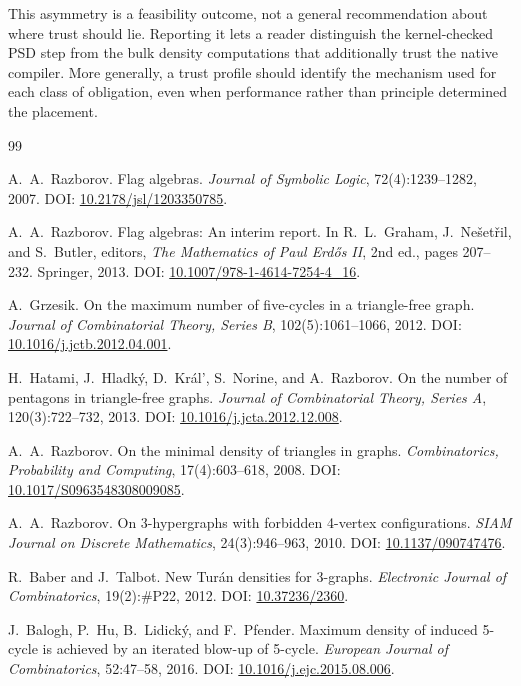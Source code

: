 \documentclass{article}
\newcommand\DOI[1]{DOI: \href{https://doi.org/#1}{#1}}
\begin{document}
{This asymmetry is a feasibility outcome, not a general recommendation about
where trust should lie.  Reporting it lets a reader distinguish the
kernel-checked PSD step from the bulk density computations that additionally
trust the native compiler.  More generally, a trust profile should identify
the mechanism used for each class of obligation, even when performance rather
than principle determined the placement.
}


\begin{thebibliography}{99}

A.~A.~Razborov.
\newblock Flag algebras.
\newblock \textit{Journal of Symbolic Logic}, 72(4):1239--1282, 2007.
  \DOI{10.2178/jsl/1203350785}.

A.~A.~Razborov.
\newblock Flag algebras: An interim report.
\newblock In R.~L.~Graham, J.~Ne\v{s}et\v{r}il, and S.~Butler, editors,
  \textit{The Mathematics of Paul Erd\H{o}s II}, 2nd ed., pages 207--232.
  Springer, 2013. \DOI{10.1007/978-1-4614-7254-4\_16}.

A.~Grzesik.
\newblock On the maximum number of five-cycles in a triangle-free graph.
\newblock \textit{Journal of Combinatorial Theory, Series B},
  102(5):1061--1066, 2012. \DOI{10.1016/j.jctb.2012.04.001}.

H.~Hatami, J.~Hladk\'{y}, D.~Kr\'{a}l', S.~Norine, and A.~Razborov.
\newblock On the number of pentagons in triangle-free graphs.
\newblock \textit{Journal of Combinatorial Theory, Series A},
  120(3):722--732, 2013. \DOI{10.1016/j.jcta.2012.12.008}.

A.~A.~Razborov.
\newblock On the minimal density of triangles in graphs.
\newblock \textit{Combinatorics, Probability and Computing}, 17(4):603--618,
  2008. \DOI{10.1017/S0963548308009085}.

A.~A.~Razborov.
\newblock On 3-hypergraphs with forbidden 4-vertex configurations.
\newblock \textit{SIAM Journal on Discrete Mathematics}, 24(3):946--963, 2010.
  \DOI{10.1137/090747476}.

R.~Baber and J.~Talbot.
\newblock New Tur\'{a}n densities for 3-graphs.
\newblock \textit{Electronic Journal of Combinatorics}, 19(2):\#P22, 2012.
  \DOI{10.37236/2360}.

J.~Balogh, P.~Hu, B.~Lidick\'{y}, and F.~Pfender.
\newblock Maximum density of induced 5-cycle is achieved by an iterated blow-up
  of 5-cycle.
\newblock \textit{European Journal of Combinatorics}, 52:47--58, 2016.
  \DOI{10.1016/j.ejc.2015.08.006}.


\end{thebibliography}
\end{document}
